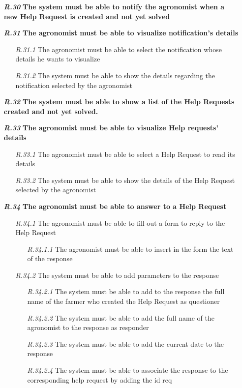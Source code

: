 \begin{itemize}
\item [\textbf{\textit{R.30}}] \textbf{The system must be able to notify the agronomist when a new Help Request is created and not yet solved}
\item [\textbf{\textit{R.31}}] \textbf{The agronomist must be able to visualize notification’s details}
        \begin{itemize}
            \item [\textit{R.31.1}] The agronomist must be able to select the notification whose details he wants to visualize
            \item [\textit{R.31.2}] The system must be able to show the details regarding the notification selected by the agronomist
        \end{itemize}
        \item [\textbf{\textit{R.32}}] \textbf{The system must be able to show a list of the Help Requests created and not yet solved.}
        \item [\textbf{\textit{R.33}}]\textbf{ The agronomist must be able to visualize Help requests' details}
        \begin{itemize}
            \item [\textit{R.33.1}] The agronomist must be able to select a Help Request to read its details
            \item [\textit{R.33.2}] The system must be able to show the details of the Help Request selected by the agronomist
        \end{itemize}
        \item [\textbf{\textit{R.34}}] \textbf{The agronomist must be able to answer to a Help Request}
        \begin{itemize}
            \item [\textit{R.34.1}] The agronomist must be able to fill out a form to reply to the Help Request
            \begin{itemize}
                \item [\textit{R.34.1.1}] The agronomist must be able to insert in the form the text of the response
            \end{itemize}
            \item [\textit{R.34.2}] The system must be able to add parameters to the response
            \begin{itemize}
                \item [\textit{R.34.2.1}] The system must be able to add to the response the full name of the farmer who created the Help Request as questioner
                \item [\textit{R.34.2.2}] The system must be able to add the full name of the agronomist to the response as responder
		        \item [\textit{R.34.2.3}] The system must be
		        able to add the current date to the response
		        \item [\textit{R.34.2.4}] The system must be able to associate the response to the corresponding help request by adding the id req
            \end{itemize}
        \end{itemize}



\end{itemize}
